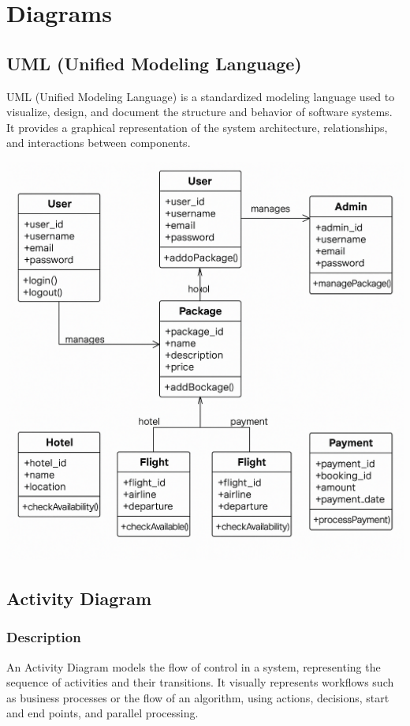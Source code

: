 \section{Diagrams}

\subsection{UML (Unified Modeling Language)}
UML (Unified Modeling Language) is a standardized modeling language used to visualize, design, and document the structure and behavior of software systems. It provides a graphical representation of the system architecture, relationships, and interactions between components.

\vspace{0.5cm}
\begin{center}
\includegraphics[width=1.0\textwidth]{./figures/UML Diagram/uml2.0.png} %
\end{center}
\vspace{0.5cm}

\subsection{Activity Diagram}
\subsubsection{Description}
An Activity Diagram models the flow of control in a system, representing the sequence of activities and their transitions. It visually represents workflows such as business processes or the flow of an algorithm, using actions, decisions, start and end points, and parallel processing.


